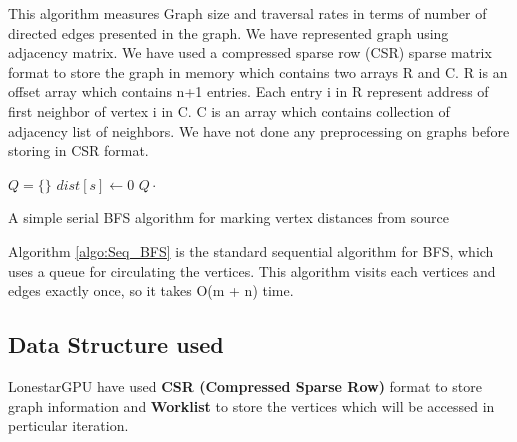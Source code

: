 \documentclass{article}
\begin{document}
This algorithm measures Graph size and traversal rates in terms of number of directed edges presented in the graph. We have represented graph using adjacency matrix. We have used a compressed sparse row (CSR) sparse matrix format to store the graph in memory which contains two arrays R and C. R is an offset array which contains n+1 entries. Each entry i in R represent address of first neighbor of vertex i in C. C is an array which contains collection of adjacency list of neighbors. We have not done any preprocessing on graphs before storing in CSR format.   \\


\IncMargin{1em}
\begin{algorithm}
	\BlankLine
	\emph{$Q = \{\}$  }\;
	\BlankLine
	\BlankLine
	\emph{ $dist[s] \leftarrow 0$ }\;
	\emph{ $Q\cdot$ }\;
	\BlankLine
\caption{A simple serial BFS algorithm for marking vertex distances from source}\label{algo:Seq_BFS}
\end{algorithm}\DecMargin{1em}


Algorithm \ref{algo:Seq_BFS} is the standard sequential algorithm for BFS, which uses a queue for circulating the vertices. This algorithm visits each vertices and edges exactly once, so it takes O(m + n) time.



\subsection{ Data Structure used }

LonestarGPU have used \textbf{CSR (Compressed Sparse Row)} format to store graph information and \textbf{Worklist} to store the vertices which will be accessed in perticular iteration. \\
\end{document}
